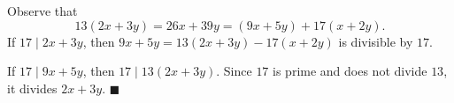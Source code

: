 Observe that
\[13(2x+3y)=26x+39y=(9x+5y)+17(x+2y).\]
If $17\mid2x+3y$, then $9x+5y=13(2x+3y)-17(x+2y)$ is divisible by $17$.

If $17\mid9x+5y$, then $17\mid13(2x+3y)$. Since $17$ is prime and does not divide $13$, it divides $2x+3y$. $\blacksquare$
